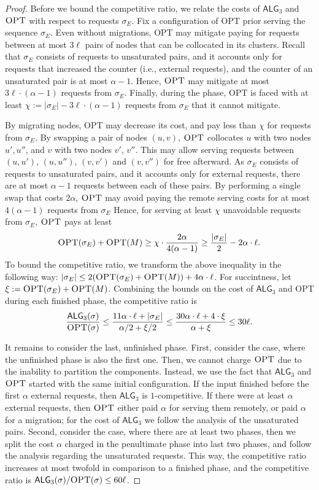 \documentclass[a4paper,anonymous,USenglish]{lipics-v2019}
\newcommand{\OPT}{\textsc{OPT}\xspace}
\newcommand{\TAlg}{{\ensuremath{\textsf{ALG}_{3}}}\xspace}
\begin{document}
\begin{proof}
	\medskip
	Before we bound the competitive ratio, we relate the costs of $\TAlg$ and $\OPT$ with respect to requests $\sigma_E$.
	Fix a configuration of \OPT prior serving the sequence $\sigma_E$.
	Even without migrations, \OPT may mitigate paying for requests between at most $3\ell$ pairs of nodes that can be collocated in its clusters.
	Recall that $\sigma_E$ consists of requests to unsaturated pairs, and it accounts only for requests that increased the counter (i.e., external requests), and the counter of an unsaturated pair is at most $\alpha - 1$.
	Hence, $\OPT$ may mitigate at most $3\ell\cdot(\alpha - 1)$ requests from $\sigma_E$.
	Finally, during the phase, \OPT is faced with at least $\chi := |\sigma_E| - 3\ell\cdot(\alpha-1)$ requests from $\sigma_E$ that it cannot mitigate.

	By migrating nodes, \OPT may decrease its cost, and pay less than $\chi$ for requests from $\sigma_E$.
	By swapping a pair of nodes $(u,v)$, $\OPT$ collocates $u$ with two nodes $u', u''$, and $v$ with two nodes $v'$, $v''$.
	This may allow serving requests between $(u,u')$, $(u,u'')$, $(v,v')$ and $(v,v'')$ for free afterward.
	As $\sigma_E$ consists of requests to unsaturated pairs, and it accounts only for external requests, there are at most $\alpha-1$ requests between each of these pairs.
	By performing a single swap that costs $2\alpha$, $\OPT$ may avoid paying the remote serving costs for at most $4 (\alpha - 1)$ requests from $\sigma_E$
	Hence, for serving at least $\chi$ unavoidable requests from $\sigma_E$, $\OPT$ pays at least
	\[
		\OPT(\sigma_E) + \OPT(M) \geq \chi \cdot \frac{2\alpha}{4 (\alpha-1)}\geq \frac{|\sigma_E|} {2} - 2 \alpha \cdot \ell.
	\]
	To bound the competitive ratio, we transform the above inequality in the following way: $|\sigma_E| \leq 2(\OPT(\sigma_E)+\OPT(M)) + 4\alpha \cdot \ell$.
	For succintness, let $\xi := \OPT(\sigma_E) + \OPT(M)$.
	Combining the bounds on the cost of \TAlg and \OPT during each finished phase, the competitive ratio is
%
	\[
		\frac{\TAlg(\sigma)}{\OPT(\sigma)} \leq \frac{11\alpha \cdot \ell + |\sigma_E|}{\alpha/2 + \xi/2} \leq \frac{30\alpha\cdot\ell + 4\cdot \xi}{\alpha + \xi} \leq 30 \ell.
	\]
%	
	\medskip
	
	It remains to consider the last, unfinished phase.
	First, consider the case, where the unfinished phase is also the first one.
	Then, we cannot charge $\OPT$ due to the inability to partition the components.
	Instead, we use the fact that \TAlg and $\OPT$ started with the same initial configuration.
	If the input finished before the first $\alpha$ external requests, then \TAlg is $1$-competitive.
	If there were at least $\alpha$ external requests, then $\OPT$ either paid $\alpha$ for serving them remotely, or paid $\alpha$ for a migration; for the cost of \TAlg we follow the analysis of the unsaturated pairs.
	Second, consider the case, where there are at least two phases, then we split the cost $\alpha$ charged in the penultimate phase into last two phases, and follow the analysis regarding the unsaturated requests.
	This way, the competitive ratio increases at most twofold in comparison to a finished phase, and the competitive ratio is $\TAlg(\sigma)/\OPT(\sigma) \leq 60\ell$.
\end{proof}
\end{document}
